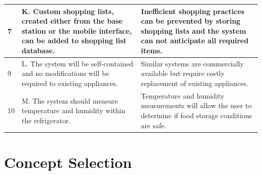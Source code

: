 \documentclass[11pt]{article} %
\begin{document}
\begin{table}[h!]
\begin{center}
\begin{tabular}{| p{1.2in} | p{2.5in} |p{2.5in} |}
\hline
7&K. Custom shopping lists, created either from the base station or the mobile interface, can be added to shopping list database.&Inefficient shopping practices can be prevented by storing shopping lists and the system can not anticipate all required items.\\
\hline
9&L. The system will be self-contained and no modifications will be required to existing appliances.&Similar systems are commercially available but require costly replacement of existing appliances.\\
\hline
10&M. The system should measure temperature and humidity within the refrigerator. & Temperature and humidity measurements will allow the user to determine if food storage conditions are safe. \\
\hline
\end{tabular}
\end{center}
\end{table}
\pagebreak
\section{Concept Selection}
\end{document}
